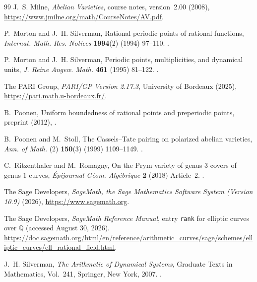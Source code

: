 \documentclass[11pt,a4paper]{amsart}
\theoremstyle{definition}
\theoremstyle{remark}
\numberwithin{equation}{section}
\newcommand{\Q}{\mathbb{Q}}
\begin{document}
\begin{thebibliography}{99}
J.~S. Milne, \textit{Abelian Varieties}, course notes, version~2.00
  (2008), \url{https://www.jmilne.org/math/CourseNotes/AV.pdf}.

P.~Morton and J.~H. Silverman, Rational periodic points of rational functions,
  \textit{Internat. Math. Res. Notices} \textbf{1994}(2) (1994) 97--110.
\newblock \href{https://doi.org/10.1155/S1073792894000127}
  {}.

P.~Morton and J.~H. Silverman, Periodic points, multiplicities, and dynamical
  units, \textit{J. Reine Angew. Math.} \textbf{461} (1995) 81--122.
\newblock \href{https://doi.org/10.1515/crll.1995.461.81}
  {}.

The PARI Group, \textit{PARI/GP Version 2.17.3}, University of Bordeaux
  (2025), \url{https://pari.math.u-bordeaux.fr/}.

B.~Poonen, Uniform boundedness of rational points and preperiodic points,
  preprint (2012), \href{https://arxiv.org/abs/1206.7104}
  {}.

B.~Poonen and M.~Stoll, The Cassels--Tate pairing on polarized abelian
  varieties, \textit{Ann. of Math.} (2) \textbf{150}(3) (1999) 1109--1149.
\newblock \href{https://doi.org/10.2307/121064}
  {}.

C.~Ritzenthaler and M.~Romagny, On the Prym variety of genus $3$ covers of
  genus $1$ curves, \textit{\'{E}pijournal G\'{e}om. Alg\'{e}brique}
  \textbf{2} (2018) Article~2.
\newblock \href{https://doi.org/10.46298/epiga.2018.volume2.3663}
  {}.

The Sage Developers, \textit{SageMath, the Sage Mathematics Software System
  (Version 10.9)} (2026), \url{https://www.sagemath.org}.

The Sage Developers, \textit{SageMath Reference Manual}, entry
  \texttt{rank} for elliptic curves over \(\Q\)
  (accessed August 30, 2026).
\newblock \url{https://doc.sagemath.org/html/en/reference/arithmetic_curves/sage/schemes/elliptic_curves/ell_rational_field.html}.

J.~H. Silverman, \textit{The Arithmetic of Dynamical Systems}, Graduate Texts
  in Mathematics, Vol.~241, Springer, New York, 2007.
\newblock \href{https://doi.org/10.1007/978-0-387-69904-2}
  {}.


\end{thebibliography}
\end{document}
